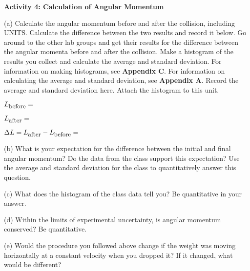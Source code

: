 \textbf{Activity 4: Calculation of Angular Momentum}

(a) Calculate the angular momentum before and after the collision, including UNITS. Calculate the difference between the two results and record it below. 
Go around to the other lab groups and get their results for the difference between the angular momenta before and after the collision.
Make a histogram of the results you collect and calculate the average and standard deviation.
For information on making histograms, see \textbf{Appendix C}. For information on calculating the average and
standard deviation, see \textbf{Appendix A}. Record the average and standard deviation here.
Attach the histogram to this unit.
\vspace{5mm}

\( L_{\mbox{\small before}}= \)  
\vspace{5mm}

\( L_{\mbox{\small after}}= \)
\vspace{5mm}

\( \Delta L= L_{\mbox{\small after}} - L_{\mbox{\small before}} = \)  
\vspace{15mm}

(b) What is your expectation for the difference between the initial and final angular momentum?
Do the data from the class support this expectation? 
Use the average and standard deviation for the class to quantitatively answer this question.
\vspace{20mm}

(c) What does the histogram of the class data tell you? Be quantitative in your answer.
\vspace{20mm}

(d) Within the limits of experimental uncertainty, is angular momentum 
conserved?  Be quantitative.
\vspace{20mm}

(e) Would the procedure you followed above change if the weight was moving horizontally at a constant velocity when you dropped it? 
If it changed, what would be different?
\vspace{20mm}

